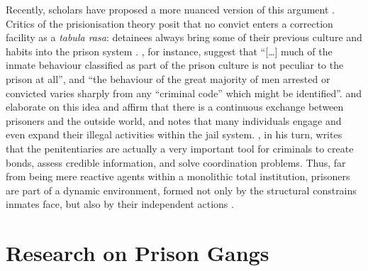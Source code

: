 Recently, scholars have proposed a more nuanced version of this argument \citep{davies1989goffman, thomas1978structural, zamble1988coping}. Critics of the prisionisation theory posit that no convict enters a correction facility as a \textit{tabula rasa}: detainees always bring some of their previous culture and habits into the prison system \citep[109]{huebner2003administrative}. \citet[142--6]{irwin1962thieves}, for instance, suggest that ``[\dots] much of the inmate behaviour classified as part of the prison culture is not peculiar to the prison at all'', and  ``the behaviour of the great majority of men arrested or convicted varies sharply from any ``criminal code'' which might be identified''. \cite{cao1997prison} and \cite{harer1996race} elaborate on this idea and affirm that there is a continuous exchange between prisoners and the outside world, and \citet[655]{delisi2003criminal} notes that many individuals engage and even expand their illegal activities within the jail system. \citet{gambetta2009codes}, in his turn, writes that the penitentiaries are actually a very important tool for criminals to create bonds, assess credible information, and solve coordination problems. Thus, far from being mere reactive agents within a monolithic total institution, prisoners are part of a dynamic environment, formed not only by the structural constrains inmates face, but also by their independent actions \citep{passos2013defesa}.

\section{Research on Prison Gangs}

